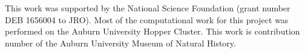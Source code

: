 This work was supported by the National Science Foundation (grant number DEB
1656004 to JRO).
Most of the computational work for this project was performed on the
Auburn University Hopper Cluster.
This work is contribution number  of the Auburn University
Museum of Natural History.
